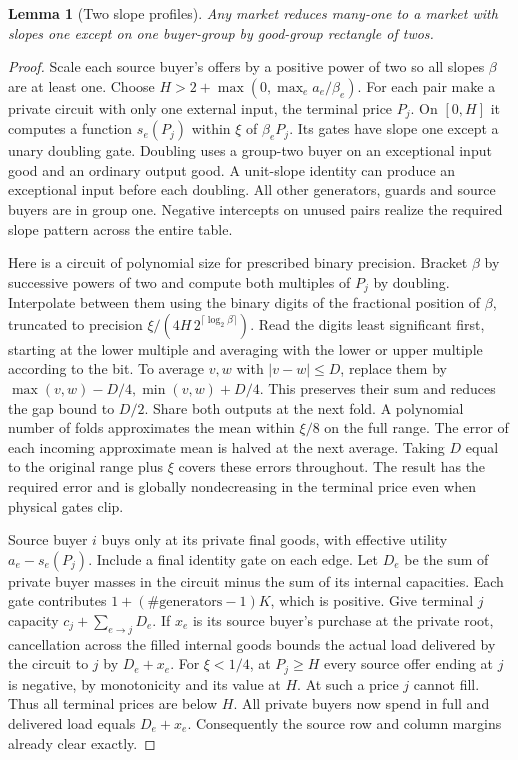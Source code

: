 \documentclass[11pt,oneside,openany,notitlepage]{report}
\newtheorem{lemma}[theorem]{Lemma}
\begin{document}
\begin{lemma}[Two slope profiles]\label{lem:rectangle}
Any market reduces many-one to a market with slopes one except on one
buyer-group by good-group rectangle of twos.
\end{lemma}
\begin{proof}
Scale each source buyer's offers by a positive power of two so all slopes
\(\beta\) are at least one. Choose \(H>2+\max(0,\max_e a_e/\beta_e)\).
For each pair make a private circuit with only one external input, the
terminal price \(P_j\). On \([0,H]\) it computes a function \(s_e(P_j)\)
within \(\xi\) of \(\beta_eP_j\). Its gates have slope one except a unary
doubling gate. Doubling uses a group-two buyer on an exceptional input
good and an ordinary output good. A unit-slope identity can produce
an exceptional input before each doubling. All other generators, guards
and source buyers are in group one. Negative intercepts on unused
pairs realize the required slope pattern across the entire table.

Here is a circuit of polynomial size for prescribed binary precision.
Bracket \(\beta\) by successive powers of two and compute both multiples
of \(P_j\) by doubling. Interpolate between them using the binary digits
of the fractional position of \(\beta\), truncated to precision
\(\xi/(4H\,2^{\lceil\log_2\beta\rceil})\). Read the digits least
significant first, starting at the lower multiple and averaging with the
lower or upper multiple according to the bit. To average \(v,w\) with
\(|v-w|\le D\), replace them by
\(\max(v,w)-D/4,\min(v,w)+D/4\). This preserves their sum and reduces the
gap bound to \(D/2\). Share both outputs at the next fold. A polynomial
number of folds approximates the mean within \(\xi/8\) on the full range.
The error of each incoming approximate mean is halved at the next
average. Taking \(D\) equal to the original range plus \(\xi\) covers
these errors throughout. The result has the required error and is
globally nondecreasing in the terminal price even when physical gates clip.

Source buyer \(i\) buys only at its private final goods, with effective
utility \(a_e-s_e(P_j)\). Include a final identity gate on each edge.
Let \(D_e\) be the sum of private buyer masses in the circuit minus the
sum of its internal capacities. Each gate contributes
\(1+(\#\text{generators}-1)K\), which is positive. Give terminal \(j\)
capacity \(c_j+\sum_{e\to j}D_e\). If \(x_e\) is its source buyer's
purchase at the private root, cancellation across the filled internal
goods bounds the actual load delivered by the circuit to \(j\) by
\(D_e+x_e\). For \(\xi<1/4\), at \(P_j\ge H\) every source offer ending
at \(j\) is negative, by monotonicity and its value at \(H\). At such
a price \(j\) cannot fill. Thus all terminal prices are below \(H\).
All private buyers now spend in full and delivered load equals \(D_e+x_e\).
Consequently the source row and column margins already clear exactly.


\end{proof}
\end{document}
